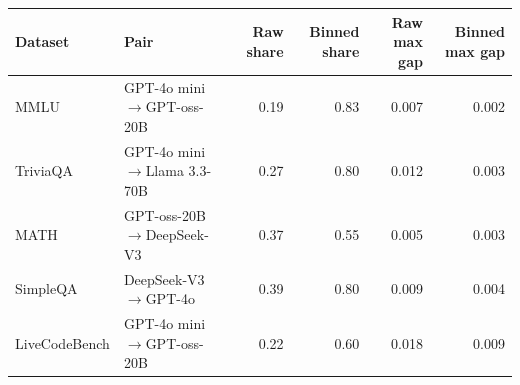 \begin{tabular}{llrrrr}
\toprule
Dataset & Pair & Raw share & Binned share & Raw max gap & Binned max gap \\
\midrule
MMLU & GPT-4o mini$\to$GPT-oss-20B & 0.19 & 0.83 & 0.007 & 0.002 \\
TriviaQA & GPT-4o mini$\to$Llama 3.3-70B & 0.27 & 0.80 & 0.012 & 0.003 \\
MATH & GPT-oss-20B$\to$DeepSeek-V3 & 0.37 & 0.55 & 0.005 & 0.003 \\
SimpleQA & DeepSeek-V3$\to$GPT-4o & 0.39 & 0.80 & 0.009 & 0.004 \\
LiveCodeBench & GPT-4o mini$\to$GPT-oss-20B & 0.22 & 0.60 & 0.018 & 0.009 \\
\bottomrule
\end{tabular}
